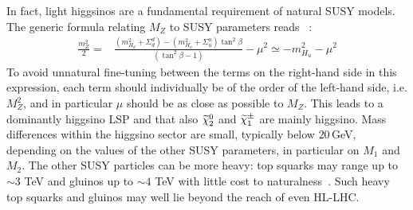 In fact, 
light higgsinos are a fundamental requirement 
of natural SUSY models.
The generic formula relating $M_Z$ to SUSY parameters reads
~\cite{Bae:2014yta}:
\begin{align}
\frac{m_Z^2}{2} =& \frac{(m_{H_d}^2+\Sigma_d^d)-(m_{H_u}^2+\Sigma_u^u)\tan^2\beta}{(\tan^2\beta -1)}
-\mu^2\simeq -m_{H_u}^2-\mu^2
\label{eq:searches_mzs}
\end{align}
To avoid unnatural fine-tuning between the terms on the right-hand side in
this expression, each term should individually be of the order of the left-hand side,
i.e.  $M^2_Z$,
and in particular $\mu$ should be as close as possible to $M_Z$.
This leads to a dominantly higgsino LSP and that
also $\mbox{$ \widetilde{\chi}^0_2 $}$ and $\mbox{$ \widetilde{\chi}^{\pm}_1 $}$ are mainly higgsino.
Mass differences within the higgsino sector are small, 
typically  below $20$\,GeV,
depending on the values of the other SUSY parameters, 
in particular on $M_1$ and $M_2$.
The other SUSY particles can be more heavy:
top squarks may range up to $\sim 3$ TeV and gluinos 
up to $\sim 4$ TeV with little cost to naturalness~\cite{Bae:2014yta}. 
Such heavy top squarks and gluinos may well lie beyond the reach of even HL-LHC.

